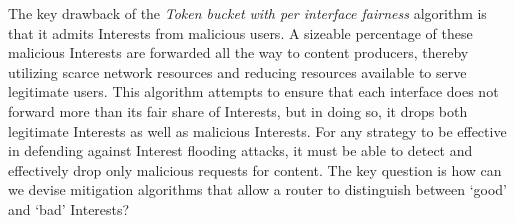 


The key drawback of the {\it Token bucket with per interface fairness} algorithm is that it admits Interests from malicious users. A sizeable percentage of these malicious Interests are forwarded all the way to content producers, thereby utilizing scarce network resources and reducing resources available to serve legitimate users.  This algorithm attempts to ensure that each interface does not forward more than its fair share of Interests, but in doing so, it drops both legitimate Interests as well as malicious Interests. For any strategy to be effective in defending against Interest flooding attacks, it must be able to detect and effectively drop only malicious requests for content. 
The key question is how can we devise mitigation algorithms that allow a router to distinguish between `good' and `bad' Interests? 


  

